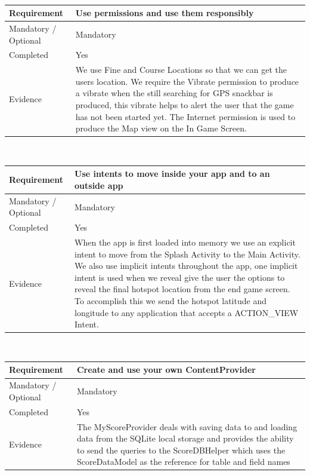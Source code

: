 \documentclass[10pt, a4paper]{article}
\begin{document}
\\
\linebreak
\linebreak
\begin{tabular}{|p{} | p{}|}
\hline 
Requirement & Use permissions and use them responsibly \\ 
\hline 
Mandatory / Optional & Mandatory \\ 
\hline 
Completed & Yes \\ 
\hline 
Evidence & We use Fine and Course Locations so that we can get the users location.  We require the Vibrate permission to produce a vibrate when the still searching for GPS snackbar is produced, this vibrate helps to alert the user that the game has not been started yet. The Internet permission is used to produce the Map view on the In Game Screen.  \\ 
\hline 
\end{tabular} 
\\
\linebreak
\linebreak
\begin{tabular}{|p{} | p{}|}
\hline 
Requirement & Use intents to move inside your app and to an outside app \\ 
\hline 
Mandatory / Optional & Mandatory \\ 
\hline 
Completed & Yes \\ 
\hline 
Evidence & When the app is first loaded into memory we use an explicit intent to move from the Splash Activity to the Main Activity. We also use implicit intents throughout the app, one implicit intent is used when we reveal give the user the options to reveal the final hotspot location from the end game screen.  To accomplish this we send the hotspot latitude and longitude to any application that accepts a ACTION\_VIEW Intent.\\ 
\hline 
\end{tabular} 
\\
\linebreak
\linebreak
\begin{tabular}{|p{} | p{}|}
\hline 
Requirement & Create and use your own ContentProvider \\ 
\hline 
Mandatory / Optional & Mandatory \\ 
\hline 
Completed & Yes \\ 
\hline 
Evidence & The MyScoreProvider deals with saving data to and loading data from the SQLite local storage and provides the ability to send the queries to the ScoreDBHelper which uses the ScoreDataModel as the reference for table and field names \\ 
\hline 
\end{tabular} 
\end{document}
